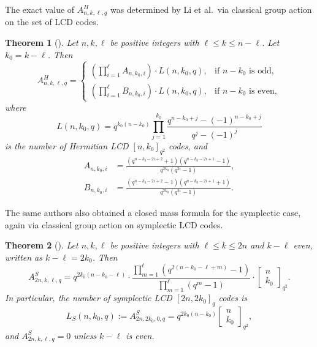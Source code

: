 \documentclass[10pt,a4paper]{amsart}
\newtheorem{theorem}{Theorem}
\begin{document}
The exact value of $A^H_{n,k,\ell,q}$ was determined by Li et al.\
via classical group action on the set of LCD codes.

\begin{theorem}[{\cite[Theorem~3.11]{LSL2024}}]\label{thm:LSL}
Let $n,k,\ell$ be positive integers with $\ell \leq k \leq n - \ell$.
Let $k_0 = k - \ell$.
Then
\[
  A^H_{n,k,\ell,q} = \begin{cases}
    \displaystyle\left(\prod_{i=1}^{\ell} A_{n,k_0,i}\right) \cdot L(n,k_0,q), & \text{if } n - k_0 \text{ is odd}, \\[10pt]
    \displaystyle\left(\prod_{i=1}^{\ell} B_{n,k_0,i}\right) \cdot L(n,k_0,q), & \text{if } n - k_0 \text{ is even},
  \end{cases}
\]
where
\[
  L(n,k_0,q) = q^{k_0(n-k_0)} \prod_{j=1}^{k_0} \frac{q^{n-k_0+j} - (-1)^{n-k_0+j}}{q^j - (-1)^j}
\]
is the number of Hermitian LCD $[n,k_0]_{q^2}$ codes, and
\begin{align*}
  A_{n,k_0,i} &= \frac{(q^{n-k_0-2i+2}+1)(q^{n-k_0-2i+1}-1)}{q^{2k_0}(q^{2i}-1)}, \\
  B_{n,k_0,i} &= \frac{(q^{n-k_0-2i+2}-1)(q^{n-k_0-2i+1}+1)}{q^{2k_0}(q^{2i}-1)}.
\end{align*}
\end{theorem}

The same authors also obtained a closed mass formula for the symplectic case,
again via classical group action on symplectic LCD codes.

\begin{theorem}[{\cite[Theorem 4.9]{LSL2024}}]\label{thm:LSL-symp}
Let $n, k, \ell$ be positive integers with $\ell \leq k \leq 2n$ and
$k - \ell$ even, written as $k - \ell = 2k_0$. Then
\[
  A^S_{2n,k,\ell,q} = q^{2k_0(n-k_0-\ell)} \cdot
  \frac{\prod_{m=1}^{\ell}(q^{2(n-k_0-\ell+m)}-1)}{\prod_{m=1}^{\ell}(q^m-1)} \cdot
  \begin{bmatrix} n \\ k_0 \end{bmatrix}_{q^2}.
\]
In particular, the number of symplectic LCD $[2n, 2k_0]_q$ codes is
\[
  L_S(n, k_0, q) := A^S_{2n, 2k_0, 0, q} = q^{2k_0(n-k_0)} \begin{bmatrix} n \\ k_0 \end{bmatrix}_{q^2},
\]
and $A^S_{2n, k, \ell, q} = 0$ unless $k - \ell$ is even.
\end{theorem}
\end{document}
